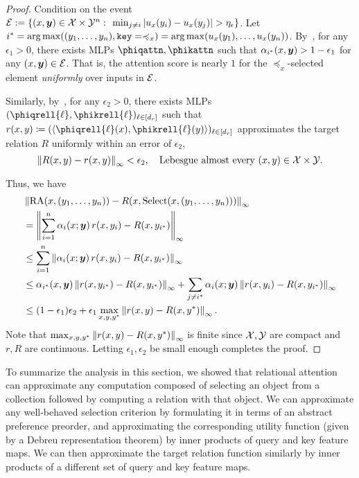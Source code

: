 \begin{proof}
  Condition on the event ${\mathcal{E}} := \{(x, \bm{y}) \in {\mathcal{X}} \times {\mathcal{Y}}^n \,\colon\, \min_{j \neq i} \left\lvert u_x(y_i) - u_x(y_j)\right\rvert > \eta_\epsilon\}$. Let $i^* = \operatorname*{arg\,max}((y_1, \ldots, y_n), \mathtt{key} = \preccurlyeq_x) = \operatorname*{arg\,max}(u_x(y_1), \ldots, u_x(y_n))$. By~\citep[Theorem 5.1]{altabaa2024approximation}, for any $\epsilon_1 > 0$, there exists MLPs $\phiqattn, \phikattn$ such that $\alpha_{i^*}(x, \bm{y}) > 1 - \epsilon_1$ for any $(x, \bm{y}) \in {\mathcal{E}}$. That is, the attention score is nearly $1$ for the $\preceq_x$-selected element \textit{uniformly} over inputs in ${\mathcal{E}}$.

  Similarly, by~\citep[Theorem 3.1]{altabaa2024approximation}, for any $\epsilon_2 > 0$, there exists MLPs $(\phiqrell{\ell}, \phikrell{\ell})_{\ell \in [d_r]}$ such that $r(x, y) \coloneq (\iiprod{\phiqrell{\ell}(x)}{\phikrell{\ell}(y)})_{\ell \in [d_r]}$ approximates the target relation $R$ uniformly within an error of $\epsilon_2$,
  \begin{equation*}
    \left\lVert R(x, y) - r(x, y)\right\rVert_{\infty} < \epsilon_2, \quad \text{Lebesgue almost every } (x, y) \in {\mathcal{X}} \times {\mathcal{Y}}.
  \end{equation*}

  Thus, we have
  \begin{align*}
    &\left\lVert\mathrm{RA}(x, (y_1, \ldots, y_n)) - R(x, \mathrm{Select}(x, (y_1, \ldots, y_n)))\right\rVert_{\infty} \\
    &= \left\lVert\sum_{i=1}^{n} \alpha_i(x; \bm{y}) \,r(x, y_i) - R(x, y_{i^*})\right\rVert_{\infty} \\
    &\leq \sum_{i=1}^{n} \left\lVert\alpha_i(x; \bm{y}) \,r(x, y_i) - R(x, y_{i^*})\right\rVert_{\infty} \\
    &\leq \alpha_{i^*}(x, \bm{y}) \left\lVert r(x, y_{i^*}) - R(x, y_{i^*})\right\rVert_{\infty} + \sum_{j \neq i^*} \alpha_i(x; \bm{y}) \left\lVert r(x, y_i) - R(x, y_{i^*})\right\rVert_{\infty}\\
    &\leq (1 - \epsilon_1) \epsilon_2 + \epsilon_1 \max_{x, y, y^*} \left\lVert r(x, y) - R(x, y^{*})\right\rVert_{\infty}.
  \end{align*}
  Note that $\max_{x, y, y^*} \left\lVert r(x, y) - R(x, y^*)\right\rVert_{\infty}$ is finite since ${\mathcal{X}}, {\mathcal{Y}}$ are compact and $r, R$ are continuous. Letting $\epsilon_1, \epsilon_2$ be small enough completes the proof.
\end{proof}

To summarize the analysis in this section, we showed that relational attention can approximate any computation composed of selecting an object from a collection followed by computing a relation with that object. We can approximate any well-behaved selection criterion by formulating it in terms of an abstract preference preorder, and approximating the corresponding utility function (given by a Debreu representation theorem) by inner products of query and key feature maps. We can then approximate the target relation function similarly by inner products of a different set of query and key feature maps.

